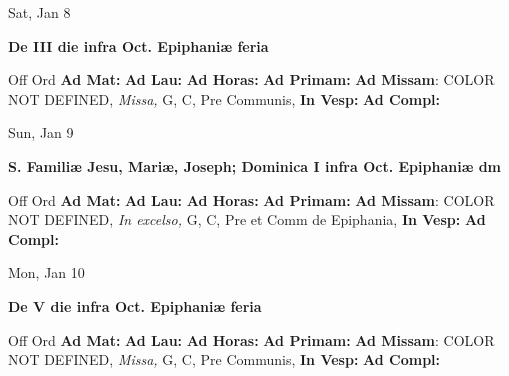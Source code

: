 \documentclass[10pt]{book}
\begin{document}
\begin{center}
\begin{minipage}{3.5in}
\vspace{2em}
\begin{center}Sat, Jan 8
\end{center}
\textbf{ \large De III die infra Oct. Epiphaniæ
\textnormal{\normalsize feria}}

\begin{justify}Off Ord
\textbf{Ad Mat: }
\textbf{Ad Lau: }
\textbf{Ad Horas: }
\textbf{Ad Primam: }\textbf{Ad Missam}: COLOR NOT DEFINED, \textit{Missa,} G, C, Pre Communis, 
\textbf{In Vesp: }
\textbf{Ad Compl: }
\end{justify}
\end{minipage}
\end{center}

\begin{center}
\begin{minipage}{3.5in}
\vspace{2em}
\begin{center}Sun, Jan 9
\end{center}
\textbf{ \large S. Familiæ Jesu, Mariæ, Joseph; Dominica I infra Oct. Epiphaniæ
\textnormal{\normalsize dm}}

\begin{justify}Off Ord
\textbf{Ad Mat: }
\textbf{Ad Lau: }
\textbf{Ad Horas: }
\textbf{Ad Primam: }\textbf{Ad Missam}: COLOR NOT DEFINED, \textit{In excelso,} G, C, Pre et Comm de Epiphania, 
\textbf{In Vesp: }
\textbf{Ad Compl: }
\end{justify}
\end{minipage}
\end{center}

\begin{center}
\begin{minipage}{3.5in}
\vspace{2em}
\begin{center}Mon, Jan 10
\end{center}
\textbf{ \large De V die infra Oct. Epiphaniæ
\textnormal{\normalsize feria}}

\begin{justify}Off Ord
\textbf{Ad Mat: }
\textbf{Ad Lau: }
\textbf{Ad Horas: }
\textbf{Ad Primam: }\textbf{Ad Missam}: COLOR NOT DEFINED, \textit{Missa,} G, C, Pre Communis, 
\textbf{In Vesp: }
\textbf{Ad Compl: }
\end{justify}
\end{minipage}
\end{center}
\end{document}
